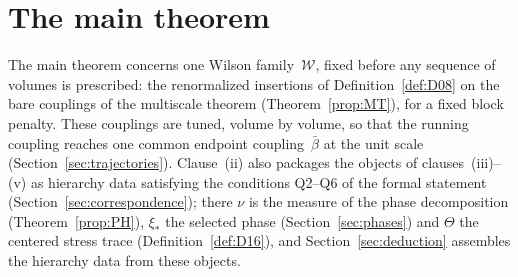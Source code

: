\section{The main theorem}\label{sec:main-theorem}\label{sec:main-theorems}

The main theorem concerns one Wilson family~$\mathcal W$, fixed before any sequence of volumes is prescribed: the renormalized insertions of Definition~\ref{def:D08} on the bare couplings of the multiscale theorem (Theorem~\ref{prop:MT}), for a fixed block penalty. These couplings are tuned, volume by volume, so that the running coupling reaches one common endpoint coupling~$\bar\beta$ at the unit scale (Section~\ref{sec:trajectories}). Clause~(ii) also packages the objects of clauses~(iii)--(v) as hierarchy data satisfying the conditions Q2--Q6 of the formal statement (Section~\ref{sec:correspondence}); there $\nu$ is the measure of the phase decomposition (Theorem~\ref{prop:PH}), $\xi_*$ the selected phase (Section~\ref{sec:phases}) and $\Theta$ the centered stress trace (Definition~\ref{def:D16}), and Section~\ref{sec:deduction} assembles the hierarchy data from these objects.


